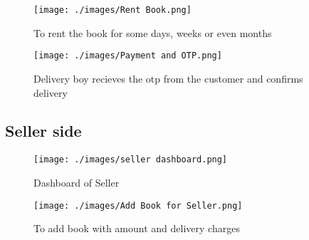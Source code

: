 \begin{figure}[h]\centering
	\texttt{[image: ./images/Rent Book.png]}
	\caption{To rent the book for some days, weeks or even months}\label{rent book}
\end{figure}

\pagebreak

\begin{figure}[h]\centering
	\texttt{[image: ./images/Payment and OTP.png]}
	\caption{Delivery boy recieves the otp from the customer and confirms delivery}\label{OTP generation}
\end{figure}

\subsection{Seller side}

\begin{figure}[h]\centering
	\texttt{[image: ./images/seller dashboard.png]}
	\caption{Dashboard of Seller}\label{seller dashboard}
\end{figure}

\begin{figure}[h]\centering
	\texttt{[image: ./images/Add Book for Seller.png]}
	\caption{To add book with amount and delivery charges}\label{add book}
\end{figure}

\pagebreak

